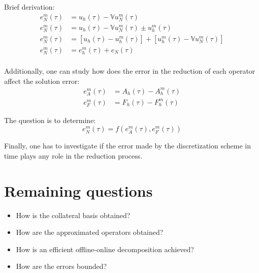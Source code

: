\documentclass[../main.tex]{subfiles}
\begin{document}
Brief derivation:
\begin{align*}
    e_{N}^{m}(\tau) &= u_h(\tau) - \mathbb{V}u_N^m(\tau) \\
    e_{N}^{m}(\tau) &= u_h(\tau) - \mathbb{V}u_N^m(\tau) \pm u_h^m(\tau) \\
    e_{N}^{m}(\tau) &= 
    \left[u_h(\tau) - u_h^m(\tau)\right] 
    +
    \left[u_h^m(\tau) - \mathbb{V}u_N^m(\tau)\right] \\
    e_{N}^{m}(\tau) &= e_{h}^{m}(\tau) + e_{N}(\tau) \\
\end{align*}

Additionally, one can study how does the error in the reduction of each operator affect the solution error:
\begin{align*}
    e^m_A(\tau) &= A_h(\tau) - A_h^m(\tau) \\
    e^m_F(\tau) &= F_h(\tau) - F_h^m(\tau)
\end{align*}

The question is to determine:
\begin{equation}
    e_{N}^{m}(\tau) = f\left(e^m_A(\tau), e^m_F(\tau)\right)
\end{equation}

Finally, one has to investigate if the error made by the discretization scheme in time plays any role in the reduction process.

\section{Remaining questions}
\begin{itemize}
    \item How is the collateral basis obtained?
    \item How are the approximated operators obtained?
    \item How is an efficient offline-online decomposition achieved?
    \item How are the errors bounded?
\end{itemize}
\end{document}
